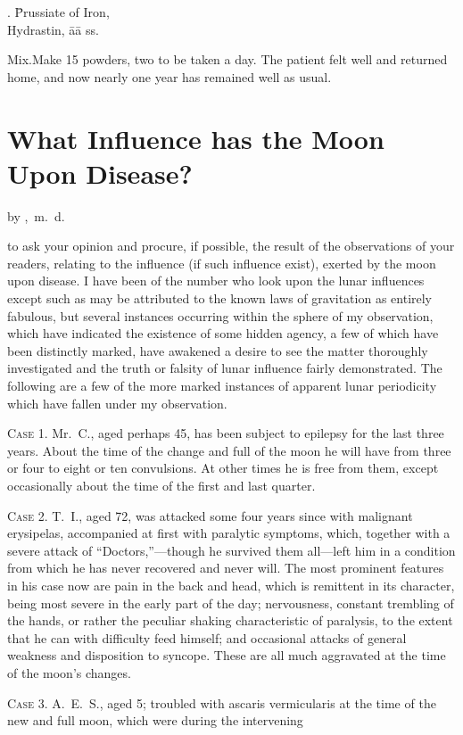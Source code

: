 
\begin{center}
\begin{tabbing}
  \prescription. \= Prussiate of Iron,  \\
    \> Hydrastin, āā \dram{} ss.
\end{tabbing}
\end{center}
Mix.\quad{}Make 15 powders, two to be taken a day. The patient felt
well and returned home, and now nearly one year has remained well as
usual.


\section*{What Influence has the Moon Upon Disease?}

by ,\ m.~d.

 to ask your opinion and procure, if possible, the result of the
observations of your readers, relating to the influence (if such influence
exist), exerted by the moon upon disease. I have been of the number
who look upon the lunar influences except such as may be attributed to
the known laws of gravitation as entirely fabulous, but several instances
occurring within the sphere of my observation, which have indicated
the existence of some hidden agency, a few of which have been distinctly
marked, have awakened a desire to see the matter thoroughly
investigated and the truth or falsity of lunar influence fairly demonstrated.
The following are a few of the more marked instances of apparent lunar
periodicity which have fallen under my observation.

\textsc{Case 1.} Mr.~C., aged perhaps 45, has been subject to epilepsy for
the last three years. About the time of the change and full of the
moon he will have from three or four to eight or ten convulsions. At
other times he is free from them, except occasionally about the time of
the first and last quarter.

\textsc{Case 2.} T.~I., aged 72, was attacked some four years since with malignant
erysipelas, accompanied at first with paralytic symptoms,
which, together with a severe attack of ``Doctors,''---though he survived
them all---left him in a condition from which he has never recovered
and never will. The most prominent features in his case now
are pain in the back and head, which is remittent in its character,
being most severe in the early part of the day; nervousness, constant
trembling of the hands, or rather the peculiar shaking characteristic of
paralysis, to the extent that he can with difficulty feed himself; and
occasional attacks of general weakness and disposition to syncope.
These  are all much aggravated at the time of the moon's
changes.

\textsc{Case 3}. A.~E.~S., aged 5; troubled with ascaris vermicularis at
the time of the new and full moon, which were during the intervening\endinput
